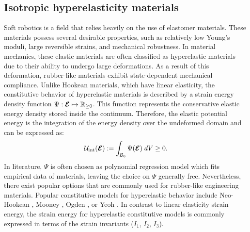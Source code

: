 \subsection{Isotropic hyperelasticity materials}
Soft robotics is a field that relies heavily on the use of elastomer materials. These materials possess several desirable properties, such as relatively low Young's moduli, large reversible strains, and mechanical robustness. In material mechanics, these elastic materials are often classified as hyperelastic materials due to their ability to undergo large deformations. As a result of this deformation, rubber-like materials exhibit state-dependent mechanical compliance. Unlike Hookean materials, which have linear elasticity, the constitutive behavior of hyperelastic materials is described by a strain energy density function ${\Psi}: \boldsymbol{\mathcal{E}} \mapsto \mathbb{R}_{\ge0}$. This function represents the conservative elastic energy density stored inside the continuum. Therefore, the elastic potential energy is the integration of the energy density over the undeformed domain and can be expressed as:
%
\begin{equation}
\mathcal{U}_{\textrm{int}}(\boldsymbol{\mathcal{E}}):= \int_{\mathcal{B}_0} \Psi(\boldsymbol{\mathcal{E}})\; dV \ge 0.
\end{equation}
%
In literature, $\Psi$ is often chosen as polynomial regression model which fits empirical data of materials, leaving the choice on $\Psi$ generally free. Nevertheless, there exist popular options that are commonly used for rubber-like engineering materials. Popular constitutive models for hyperelastic behavior include Neo-Hookean \cite{Smith2018,Bern2019,Bern2021Apr}, Mooney \cite{Kim2018}, Ogden \cite{Xavier2022Jun}, or Yeoh \cite{Renaud2011}. In contrast to linear elasticity strain energy, the strain energy for hyperelastic constitutive models is commonly expressed in terms of the strain invariants (${I}_1$, ${I}_2$, ${I}_3$).

